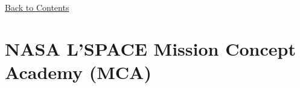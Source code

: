 \documentclass[a4paper,12pt]{article}
\begin{document}






\hyperlink{toc}{Back to Contents}
\section{NASA L'SPACE Mission Concept Academy (MCA)}
\end{document}
